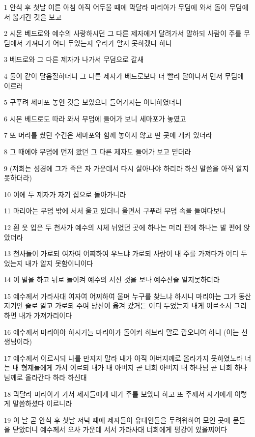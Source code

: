 \par 1 안식 후 첫날 이른 아침 아직 어두울 때에 막달라 마리아가 무덤에 와서 돌이 무덤에서 옮겨간 것을 보고
\par 2 시몬 베드로와 예수의 사랑하시던 그 다른 제자에게 달려가서 말하되 사람이 주를 무덤에서 가져다가 어디 두었는지 우리가 알지 못하겠다 하니
\par 3 베드로와 그 다른 제자가 나가서 무덤으로 갈새
\par 4 둘이 같이 달음질하더니 그 다른 제자가 베드로보다 더 빨리 달아나서 먼저 무덤에 이르러
\par 5 구푸려 세마포 놓인 것을 보았으나 들어가지는 아니하였더니
\par 6 시몬 베드로도 따라 와서 무덤에 들어가 보니 세마포가 놓였고
\par 7 또 머리를 쌌던 수건은 세마포와 함께 놓이지 않고 딴 곳에 개켜 있더라
\par 8 그 때에야 무덤에 먼저 왔던 그 다른 제자도 들어가 보고 믿더라
\par 9 (저희는 성경에 그가 죽은 자 가운데서 다시 살아나야 하리라 하신 말씀을 아직 알지 못하더라)
\par 10 이에 두 제자가 자기 집으로 돌아가니라
\par 11 마리아는 무덤 밖에 서서 울고 있더니 울면서 구푸려 무덤 속을 들여다보니
\par 12 흰 옷 입은 두 천사가 예수의 시체 뉘었던 곳에 하나는 머리 편에 하나는 발 편에 앉았더라
\par 13 천사들이 가로되 여자여 어찌하여 우느냐 가로되 사람이 내 주를 가져다가 어디 두었는지 내가 알지 못함이니이다
\par 14 이 말을 하고 뒤로 돌이켜 예수의 서신 것을 보나 예수신줄 알지못하더라
\par 15 예수께서 가라사대 여자여 어찌하여 울며 누구를 찾느냐 하시니 마리아는 그가 동산지기인 줄로 알고 가로되 주여 당신이 옮겨 갔거든 어디 두었는지 내게 이르소서 그리하면 내가 가져가리이다
\par 16 예수께서 마리아야 하시거늘 마리아가 돌이켜 히브리 말로 랍오니여 하니 (이는 선생님이라)
\par 17 예수께서 이르시되 나를 만지지 말라 내가 아직 아버지께로 올라가지 못하였노라 너는 내 형제들에게 가서 이르되 내가 내 아버지 곧 너희 아버지 내 하나님 곧 너희 하나님께로 올라간다 하라 하신대
\par 18 막달라 마리아가 가서 제자들에게 내가 주를 보았다 하고 또 주께서 자기에게 이렇게 말씀하셨다 이르니라
\par 19 이 날 곧 안식 후 첫날 저녁 때에 제자들이 유대인들을 두려워하여 모인 곳에 문들을 닫았더니 예수께서 오사 가운데 서서 가라사대 너희에게 평강이 있을찌어다
